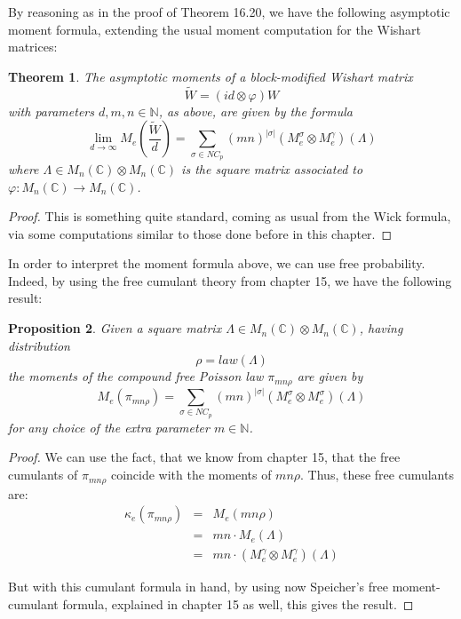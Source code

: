 \documentclass[12pt]{amsbook}
\newtheorem{theorem}{Theorem}[chapter]
\newtheorem{proposition}[theorem]{Proposition}
\begin{document}
By reasoning as in the proof of Theorem 16.20, we have the following asymptotic moment formula, extending the usual moment computation for the Wishart matrices:


\begin{theorem}
The asymptotic moments of a block-modified Wishart matrix 
$$\widetilde{W}=(id\otimes\varphi)W$$
with parameters $d,m,n\in\mathbb N$, as above, are given by the formula
$$\lim_{d\to\infty}M_e\left(\frac{\widetilde{W}}{d}\right)=\sum_{\sigma\in NC_p}(mn)^{|\sigma|}(M^\sigma_e\otimes M^\gamma_e)(\Lambda)$$
where $\Lambda\in M_n(\mathbb C)\otimes M_n(\mathbb C)$ is the square matrix associated to $\varphi:M_n(\mathbb C)\to M_n(\mathbb C)$.
\end{theorem}

\begin{proof}
This is something quite standard, coming as usual from the Wick formula, via some computations similar to those done before in this chapter.
\end{proof}

In order to interpret the moment formula above, we can use free probability. Indeed, by using the free cumulant theory from chapter 15, we have the following result:

\begin{proposition}
Given a square matrix $\Lambda\in M_n(\mathbb C)\otimes M_n(\mathbb C)$, having distribution 
$$\rho=law(\Lambda)$$
the moments of the compound free Poisson law $\pi_{mn\rho}$ are given by
$$M_e(\pi_{mn\rho})=\sum_{\sigma\in NC_p}(mn)^{|\sigma|}(M^\sigma_e\otimes M^\sigma_e)(\Lambda)$$
for any choice of the extra parameter $m\in\mathbb N$.
\end{proposition}

\begin{proof}
We can use the fact, that we know from chapter 15, that the free cumulants of $\pi_{mn\rho}$ coincide with the moments of $mn\rho$. Thus, these free cumulants are:
\begin{eqnarray*}
\kappa_e(\pi_{mn\rho})
&=&M_e(mn\rho)\\
&=&mn\cdot M_e(\Lambda)\\
&=&mn\cdot (M^\gamma_e\otimes M^\gamma_e)(\Lambda)
\end{eqnarray*}

But with this cumulant formula in hand, by using now Speicher's free moment-cumulant formula, explained in chapter 15 as well, this gives the result.
\end{proof}
\end{document}
